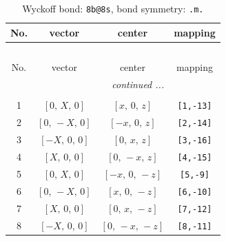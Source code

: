 \documentclass[fleqn,8pt]{jsarticle}
\begin{document}
\begin{longtable}{cccc}
\caption{Wyckoff bond: {\tt 8b@8s}, bond symmetry: {\tt .m.}}
 \\
 \hline \hline
No. & vector & center & mapping \\ \hline \endfirsthead

\multicolumn{3}{l}{\tablename\ \thetable{}} \\
 \hline \hline
No. & vector & center & mapping \\ \hline \endhead

 \hline \hline
\multicolumn{3}{r}{\footnotesize\it continued ...} \\ \endfoot

 \hline \hline
\multicolumn{3}{r}{} \\ \endlastfoot

1 & $\left[ 0,\, X,\, 0 \right]$ & $\left[ x,\, 0,\, z \right]$ & {\tt [1,-13]} \\ \hline
2 & $\left[ 0,\, - X,\, 0 \right]$ & $\left[ - x,\, 0,\, z \right]$ & {\tt [2,-14]} \\ \hline
3 & $\left[ - X,\, 0,\, 0 \right]$ & $\left[ 0,\, x,\, z \right]$ & {\tt [3,-16]} \\ \hline
4 & $\left[ X,\, 0,\, 0 \right]$ & $\left[ 0,\, - x,\, z \right]$ & {\tt [4,-15]} \\ \hline
5 & $\left[ 0,\, X,\, 0 \right]$ & $\left[ - x,\, 0,\, - z \right]$ & {\tt [5,-9]} \\ \hline
6 & $\left[ 0,\, - X,\, 0 \right]$ & $\left[ x,\, 0,\, - z \right]$ & {\tt [6,-10]} \\ \hline
7 & $\left[ X,\, 0,\, 0 \right]$ & $\left[ 0,\, x,\, - z \right]$ & {\tt [7,-12]} \\ \hline
8 & $\left[ - X,\, 0,\, 0 \right]$ & $\left[ 0,\, - x,\, - z \right]$ & {\tt [8,-11]} \\
\end{longtable}
\renewcommand{\arraystretch}{1.2}
\end{document}
